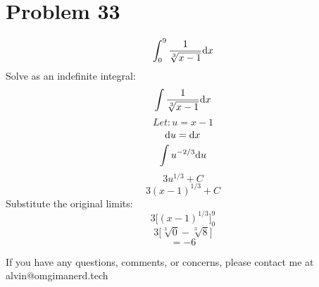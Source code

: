 \documentclass[letterpaper, 12pt]{math}
\begin{document}
\section*{Problem 33}
\[ \int_{0}^{9}{\frac{1}{\sqrt[3]{x-1}}\mathrm{d}{x}} \]
Solve as an indefinite integral:
\[ \int{\frac{1}{\sqrt[3]{x-1}}\mathrm{d}{x}} \]
\[ Let: u = x-1 \]
\[ \mathrm{d}{u} = \mathrm{d}{x} \]
\[ \int{u^{-2/3}\mathrm{d}{u}} \]
\[ 3u^{1/3}+C \]
\[ 3(x-1)^{1/3}+C \]
Substitute the original limits:
\[ 3\bigg[(x-1)^{1/3}\bigg]_{0}^{9} \]
\[ 3\bigg[\sqrt[3]{0}-\sqrt[3]{8}] \]
\[ = -6 \]

\begin{center}
  If you have any questions, comments, or concerns, please contact me at
  alvin@omgimanerd.tech
\end{center}
\end{document}
